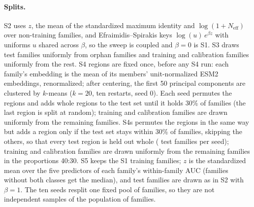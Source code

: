 \paragraph{Splits.} S2 uses $z$, the mean of the standardized maximum identity and $\log(1+N_{\mathrm{eff}})$ over non-training families, and Efraimidis--Spirakis keys $\log(u)\,e^{\beta z}$ with uniforms $u$ shared across $\beta$, so the sweep is coupled and $\beta=0$ is S1. S3 draws test families uniformly from orphan families and training and calibration families uniformly from the rest. S4 regions are fixed once, before any S4 run: each family's embedding is the mean of its members' unit-normalized ESM2 embeddings, renormalized; after centering, the first 50 principal components are clustered by $k$-means ($k=20$, ten restarts, seed 0). Each seed permutes the regions and adds whole regions to the test set until it holds 30\% of families (the last region is split at random); training and calibration families are drawn uniformly from the remaining families. S4s permutes the regions in the same way but adds a region only if the test set stays within 30\% of families, skipping the others, so that every test region is held out whole (\sFourStrictTestFam{} test families per seed); training and calibration families are drawn uniformly from the remaining families in the proportions 40:30. S5 keeps the S1 training families; $z$ is the standardized mean over the five predictors of each family's within-family AUC (families without both classes get the median), and test families are drawn as in S2 with $\beta=1$. The ten seeds resplit one fixed pool of families, so they are not independent samples of the population of families.

